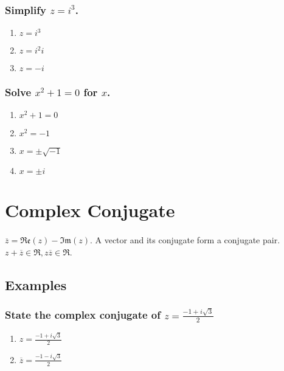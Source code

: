 \documentclass{report}
\newcommand{\re}[1]{\mathfrak{Re}(#1)}
\newcommand{\im}[1]{\mathfrak{Im}(#1)}
\newcommand{\conjugate}[1]{\overline{#1}}
\newcommand{\realnumbers}{\mathfrak{R}}
\begin{document}
                \subsubsection{Simplify $z=i^3$.}
                    \begin{enumerate}
                        \item $z=i^3$
                        \item $z=i^2i$
                        \item $z=-i$
                    \end{enumerate}
                \subsubsection{Solve $x^2+1=0$ for $x$.}
                    \begin{enumerate}
                        \item $x^2+1=0$
                        \item $x^2=-1$
                        \item $x=\pm\sqrt{-1}$
                        \item $x=\pm i$
                    \end{enumerate}
        \section{Complex Conjugate}
            \paragraph{}
                $\conjugate{z}=\re{z}-\im{z}$. A vector and its conjugate form a conjugate pair. $z+\conjugate{z}\in\realnumbers,z\conjugate{z}\in\realnumbers$.
            \subsection{Examples}
                \subsubsection{State the complex conjugate of $z=\frac{-1+i\sqrt{3}}{2}$}
                    \begin{enumerate}
                        \item $z=\frac{-1+i\sqrt{3}}{2}$
                        \item $\conjugate{z}=\frac{-1-i\sqrt{3}}{2}$
                    \end{enumerate}
\end{document}
